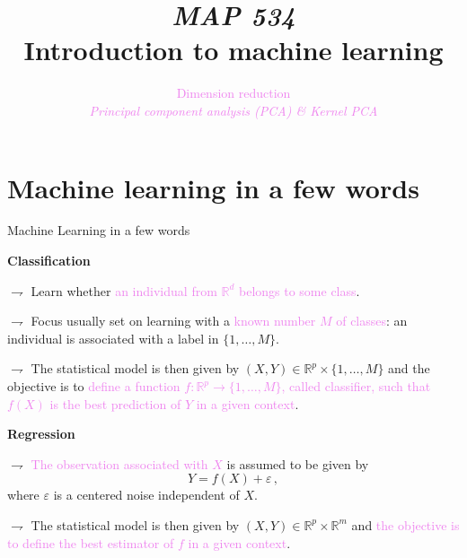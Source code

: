 \documentclass[9pt]{beamer}
\title[Introduction to machine learning]{{\em MAP 534} \\
Introduction to machine learning\\}
\author{}
\date{}
\begin{document}
\author[S. Le Corff]{\textcolor{violet}{Dimension reduction}\\ {\em {\small \textcolor{violet}{Principal component analysis (PCA) \& Kernel PCA}}}}

%
%
%
%
%
%
%
%
%
%
%
%
%
%
%

\begin{frame}
  \maketitle 
\end{frame}

\section{Machine learning in a few words}

\begin{frame}{Machine Learning in a few words}

\textcolor{lighto}{{\bf Classification}}


$\rightharpoondown$  Learn whether \textcolor{violet}{an individual from $\mathbb{R}^d$ belongs to some class}. 

$\rightharpoondown$  Focus usually set on learning with a \textcolor{violet}{known number $M$ of classes}:  an individual is associated with a label in $\{1,\ldots,M\}$. 

$\rightharpoondown$  The statistical model is then given by $(X,Y)\in\mathbb{R}^p\times \{1,\ldots,M\}$ and the objective is to \textcolor{violet}{define a function $f: \mathbb{R}^p \to \{1,\ldots,M\}$, called classifier, such that $f(X)$ is the best prediction of $Y$ in a given context}.

\vspace{.5cm}

\textcolor{lighto}{{\bf Regression}}



$\rightharpoondown$ \textcolor{violet}{The observation associated with $X$} is assumed to be given by
$$
Y = f(X) + \varepsilon\,,
$$
where $\varepsilon$ is a centered noise independent of $X$. 

$\rightharpoondown$ The statistical model is then given by $(X,Y)\in\mathbb{R}^p\times \mathbb{R}^m$ and \textcolor{violet}{the objective is to define the  best estimator of $f$ in a given context}. %
\end{frame}
\end{document}

